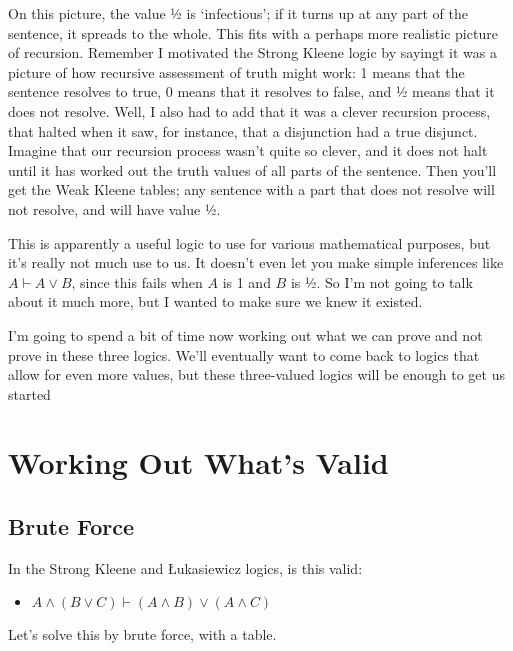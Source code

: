 \documentclass[
]{article}
\providecommand{\tightlist}{%
  \setlength{\itemsep}{0pt}\setlength{\parskip}{0pt}}\usepackage{longtable,booktabs,array}
\begin{document}
On this picture, the value ½ is `infectious'; if it turns up at any part
of the sentence, it spreads to the whole. This fits with a perhaps more
realistic picture of recursion. Remember I motivated the Strong Kleene
logic by sayingt it was a picture of how recursive assessment of truth
might work: 1 means that the sentence resolves to true, 0 means that it
resolves to false, and ½ means that it does not resolve. Well, I also
had to add that it was a clever recursion process, that halted when it
saw, for instance, that a disjunction had a true disjunct. Imagine that
our recursion process wasn't quite so clever, and it does not halt until
it has worked out the truth values of all parts of the sentence. Then
you'll get the Weak Kleene tables; any sentence with a part that does
not resolve will not resolve, and will have value ½.

This is apparently a useful logic to use for various mathematical
purposes, but it's really not much use to us. It doesn't even let you
make simple inferences like \(A \vdash A \vee B\), since this fails when
\(A\) is 1 and \(B\) is ½. So I'm not going to talk about it much more,
but I wanted to make sure we knew it existed.

I'm going to spend a bit of time now working out what we can prove and
not prove in these three logics. We'll eventually want to come back to
logics that allow for even more values, but these three-valued logics
will be enough to get us started

\hypertarget{working-out-whats-valid}{%
\section{Working Out What's Valid}\label{working-out-whats-valid}}

\hypertarget{brute-force}{%
\subsection{Brute Force}\label{brute-force}}

In the Strong Kleene and Łukasiewicz logics, is this valid:

\begin{itemize}
\tightlist
\item
  \(A \wedge (B \vee C) \vdash (A \wedge B) \vee (A \wedge C)\)
\end{itemize}

Let's solve this by brute force, with a table.
\end{document}
